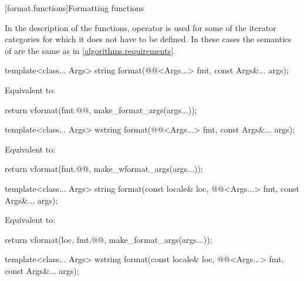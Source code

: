 [format.functions]{Formatting functions}

\pnum
In the description of the functions, operator \tcode{+} is used
for some of the iterator categories for which it does not have to be defined.
In these cases the semantics of  are
the same as in \ref{algorithms.requirements}.

%
\begin{itemdecl}
template<class... Args>
  string format(@@<Args...> fmt, const Args&... args);
\end{itemdecl}

\begin{itemdescr}
\pnum
\effects
Equivalent to:
\begin{codeblock}
return vformat(fmt.@@, make_format_args(args...));
\end{codeblock}
\end{itemdescr}

%
\begin{itemdecl}
template<class... Args>
  wstring format(@@<Args...> fmt, const Args&... args);
\end{itemdecl}

\begin{itemdescr}
\pnum
\effects
Equivalent to:
\begin{codeblock}
return vformat(fmt.@@, make_wformat_args(args...));
\end{codeblock}
\end{itemdescr}

%
\begin{itemdecl}
template<class... Args>
  string format(const locale& loc, @@<Args...> fmt, const Args&... args);
\end{itemdecl}

\begin{itemdescr}
\pnum
\effects
Equivalent to:
\begin{codeblock}
return vformat(loc, fmt.@@, make_format_args(args...));
\end{codeblock}
\end{itemdescr}

%
\begin{itemdecl}
template<class... Args>
  wstring format(const locale& loc, @@<Args...> fmt, const Args&... args);
\end{itemdecl}

